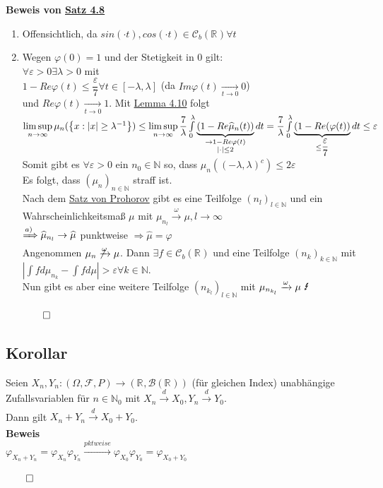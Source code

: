 \documentclass[german,10pt,oneside, fleqn, a4paper]{article}
\let\marvosymLightning\Lightning
\newcommand {\R}	{\mathbb{R}}
\newcommand {\N}	{\mathbb{N}}
\newcommand{\Ra}	{\Rightarrow}
\newcommand{\ra}{\rightarrow}
\newcommand{\lsup}[1][n]{\limsup\limits_{#1\rightarrow\infty}}
\newcommand{\brc}[1]{\left(#1\right)}
\newcommand{\brac}[1]{\left\lbrace #1\right\rbrace}
\newcommand{\folge}[3][\N]{\left(#2_#3\right)_{#3\in #1}}
\newcommand{\QED}{\begin{flushright}$\qed$\end{flushright}}
\newcommand{\mc}[1]{\mathcal{#1}}
\newcommand{\beweis}{\textbf{Beweis}\\}
\newcommand{\toinf}{\rightarrow\infty}
\newcommand{\1}[1]{1_{#1}}
\newcommand{\2}[1]{\1{\brac{#1}}}
\newcommand{\xr}[2][]{\xrightarrow[#1]{#2}}
\newcommand{\cb}[1][d]{\mc{C}_b\brc{\R^{#1}}}
\newcommand{\rbor}[1][d]{\brc{\R^{#1},\mc{B}\brc{\R^{#1}}}}
\newcommand{\raum}{\brc{\Omega,\mc{F},P}}
\newcommand{\fe}{\forall\varepsilon>0}
\newcommand{\wid}{\text{\marvosymLightning}}
\begin{document}
\textbf{Beweis von \hyperref[4.8]{Satz 4.8}}
\begin{enumerate}[label=(\alph*)]
\item Offensichtlich, da $sin(\cdot t), cos(\cdot t)\in\cb[]\forall t$
\item Wegen $\varphi(0)=1$ und der Stetigkeit in 0 gilt:\\
$\fe\exists\lambda>0$ mit\\
$1-Re\varphi(t)\leq\dfrac{\varepsilon}{7}\forall t\in[-\lambda,\lambda]$ (da $Im\varphi(t)\xr[t\ra0]{}0$) \\
und $Re\varphi(t)\xr[t\ra0]{}1$.
Mit \hyperref[4.10]{Lemma 4.10} folgt\\
$\lsup \mu_n(\brac{x:|x|\geq\lambda^{-1}})\leq\lsup\dfrac{7}{\lambda}\int\limits_0^\lambda\underbrace{(1-Re\widehat{\mu}_n(t))}_{\substack{\ra 1-Re\varphi(t)\\|\cdot|\leq 2}}dt\\
=\dfrac{7}{\lambda}\int\limits_0^\lambda\underbrace{(1-Re(\varphi(t))}_{\leq\dfrac{\varepsilon}{7}}dt\leq\varepsilon$\\
Somit gibt es $\fe$ ein $n_0\in\N$ so, dass $\mu_n((-\lambda,\lambda)^c)\leq2\varepsilon$\\
Es folgt, dass $\folge{\mu}{n}$ straff ist.\\
Nach dem \hyperref[3.15]{Satz von Prohorov} gibt es eine Teilfolge $\folge{n}{l}$ und ein Wahrscheinlichkeitsmaß $\mu$ mit $\mu_{n_l}\xr{\omega}\mu, l\toinf$\\
$\xRightarrow{a)}\widehat{\mu}_{n_l}\ra\widehat{\mu}$ punktweise $\Ra\widehat{\mu}=\varphi$\\
Angenommen $\mu_n\not\xrightarrow{\omega}\mu$. Dann $\exists f\in\cb[]$ und eine Teilfolge $\folge{n}{k}$ mit\\
$\left|\int fd\mu_{n_k}-\int fd\mu\right|>\varepsilon\forall k\in\N$.\\
Nun gibt es aber eine weitere Teilfolge $\brc{n_{k_l}}_{l\in\N}$ mit $\mu_{n_{k_l}}\xr{\omega}\mu\ \wid$\QED
\end{enumerate}

\subsection{Korollar}
\label{4.11}
Seien $X_n,Y_n:\raum\ra\rbor[]$ (für gleichen Index) unabhängige Zufallsvariablen  für $n\in\N_0$ mit $X_n\xr{d}X_0,Y_n\xr{d}Y_0$.\\
Dann gilt $X_n+Y_n\xr{d}X_0+Y_0$.\\
\beweis
$\varphi_{X_n+Y_n}=\varphi_{X_n}\varphi_{Y_n}\xr{pktweise}\varphi_{X_0}\varphi_{Y_0}=\varphi_{X_0+Y_0}$\QED
\end{document}
